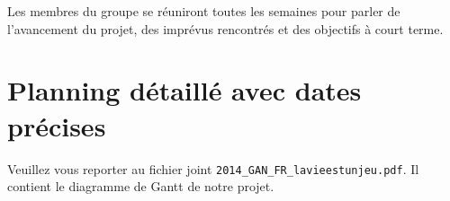 \documentclass{life-fr}
\begin{document}
Les membres du groupe se réuniront toutes les semaines pour parler de l'avancement du projet, des imprévus rencontrés et des objectifs à court terme.

\section{Planning détaillé avec dates précises}

Veuillez vous reporter au fichier joint \texttt{2014\_GAN\_FR\_lavieestunjeu.pdf}. Il contient le diagramme de Gantt de notre projet.
\end{document}
